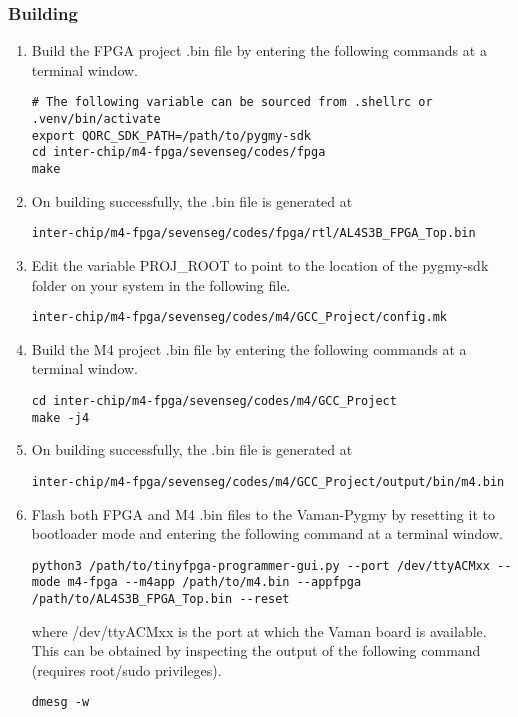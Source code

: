\subsubsection{Building}
\begin{enumerate}
    \item Build the FPGA project .bin file by entering the following commands at
    a terminal window.
    \begin{lstlisting}
# The following variable can be sourced from .shellrc or .venv/bin/activate
export QORC_SDK_PATH=/path/to/pygmy-sdk
cd inter-chip/m4-fpga/sevenseg/codes/fpga
make
    \end{lstlisting}
    \item On building successfully, the .bin file is generated at
    \begin{lstlisting}
inter-chip/m4-fpga/sevenseg/codes/fpga/rtl/AL4S3B_FPGA_Top.bin
    \end{lstlisting}
    \item Edit the variable PROJ\_ROOT to point to the location of the pygmy-sdk
    folder on your system in the following file.
    \begin{lstlisting}
inter-chip/m4-fpga/sevenseg/codes/m4/GCC_Project/config.mk
    \end{lstlisting}
    \item Build the M4 project .bin file by entering the following commands at a
    terminal window.
    \begin{lstlisting}
cd inter-chip/m4-fpga/sevenseg/codes/m4/GCC_Project
make -j4
    \end{lstlisting}
    \item On building successfully, the .bin file is generated at
    \begin{lstlisting}
inter-chip/m4-fpga/sevenseg/codes/m4/GCC_Project/output/bin/m4.bin
    \end{lstlisting}
    \item Flash both FPGA and M4 .bin files to the Vaman-Pygmy by resetting it
    to bootloader mode and entering the following command at a terminal window.
    \begin{lstlisting}
python3 /path/to/tinyfpga-programmer-gui.py --port /dev/ttyACMxx --mode m4-fpga --m4app /path/to/m4.bin --appfpga /path/to/AL4S3B_FPGA_Top.bin --reset
    \end{lstlisting}
    where /dev/ttyACMxx is the port at which the Vaman board is available. This
    can be obtained by inspecting the output of the following command (requires
    root/sudo privileges).
    \begin{lstlisting}
dmesg -w
    \end{lstlisting}
\end{enumerate}

